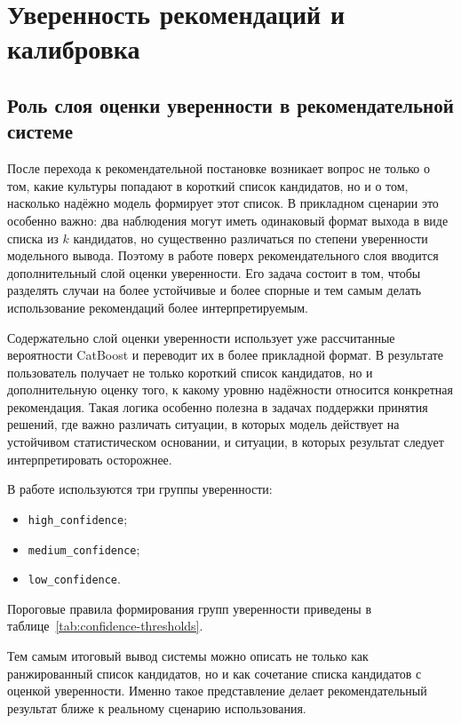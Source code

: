 \section{Уверенность рекомендаций и калибровка}

\subsection{Роль слоя оценки уверенности в рекомендательной системе}

После перехода к рекомендательной постановке возникает вопрос не только о том, какие культуры попадают в короткий
список кандидатов, но и о том, насколько надёжно модель формирует этот список. В прикладном сценарии это особенно
важно: два наблюдения могут иметь одинаковый формат выхода в виде списка из \(k\) кандидатов, но существенно
различаться по степени уверенности модельного вывода. Поэтому в работе поверх рекомендательного слоя вводится
дополнительный слой оценки уверенности. Его задача состоит в том, чтобы разделять случаи на более устойчивые и более
спорные и тем самым делать использование рекомендаций более интерпретируемым.

Содержательно слой оценки уверенности использует уже рассчитанные вероятности CatBoost и переводит их в более
прикладной формат. В результате пользователь получает не
только короткий список кандидатов, но и дополнительную оценку того, к какому уровню надёжности относится конкретная
рекомендация. Такая логика особенно полезна в задачах поддержки принятия решений, где важно различать ситуации, в
которых модель действует на устойчивом статистическом основании, и ситуации, в которых результат следует
интерпретировать осторожнее.

В работе используются три группы уверенности:

\begin{itemize}
\tightlist
\item
  \texttt{high\_confidence};
\item
  \texttt{medium\_confidence};
\item
  \texttt{low\_confidence}.
\end{itemize}

Пороговые правила формирования групп уверенности приведены в таблице~\ref{tab:confidence-thresholds}.



Тем самым итоговый вывод системы можно описать не только как ранжированный список кандидатов, но и как сочетание
списка кандидатов с оценкой уверенности. Именно такое представление делает рекомендательный результат ближе к реальному
сценарию использования.

